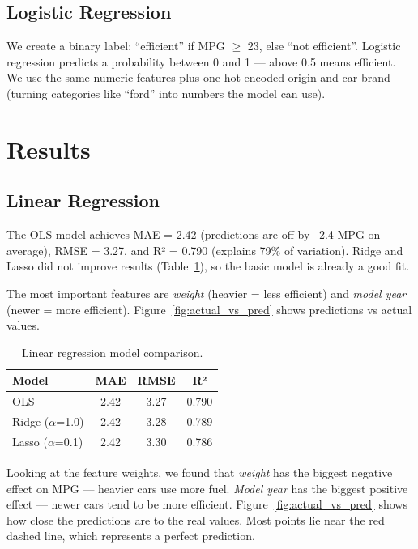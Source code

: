 \documentclass[a4paper, twocolumn]{article}
\begin{document}
\subsection{Logistic Regression}

We create a binary label: ``efficient'' if MPG $\geq$ 23, else ``not efficient''. Logistic regression predicts a probability between 0 and 1 --- above 0.5 means efficient. We use the same numeric features plus one-hot encoded origin and car brand (turning categories like ``ford'' into numbers the model can use).

\section{Results}

\subsection{Linear Regression}

The OLS model achieves MAE = 2.42 (predictions are off by ~2.4 MPG on average), RMSE = 3.27, and R² = 0.790 (explains 79\% of variation). Ridge and Lasso did not improve results (Table~\ref{tab:linreg}), so the basic model is already a good fit.

The most important features are \textit{weight} (heavier = less efficient) and \textit{model year} (newer = more efficient). Figure~\ref{fig:actual_vs_pred} shows predictions vs actual values.

\begin{table}[h]
\centering
\small
\begin{tabular}{lccc}
\hline
\textbf{Model} & \textbf{MAE} & \textbf{RMSE} & \textbf{R²} \\
\hline
OLS & 2.42 & 3.27 & 0.790 \\
Ridge ($\alpha$=1.0) & 2.42 & 3.28 & 0.789 \\
Lasso ($\alpha$=0.1) & 2.42 & 3.30 & 0.786 \\
\hline
\end{tabular}
\caption{Linear regression model comparison.}
\label{tab:linreg}
\end{table}

Looking at the feature weights, we found that \textit{weight} has the biggest negative effect on MPG --- heavier cars use more fuel. \textit{Model year} has the biggest positive effect --- newer cars tend to be more efficient. Figure~\ref{fig:actual_vs_pred} shows how close the predictions are to the real values. Most points lie near the red dashed line, which represents a perfect prediction.
\end{document}
